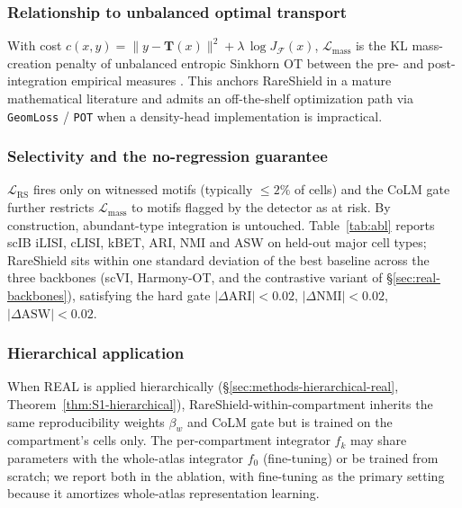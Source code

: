 \subsubsection*{Relationship to unbalanced optimal transport}

With cost $c(x,y) = \lVert y-\mathbf{T}(x)\rVert^2 + \lambda\,\log J_\mathcal{F}(x)$, $\mathcal{L}_\text{mass}$ is the KL mass-creation penalty of unbalanced entropic Sinkhorn OT between the pre- and post-integration empirical measures \citep{chizat2018uot, liero2018entropy}. This anchors RareShield in a mature mathematical literature and admits an off-the-shelf optimization path via \texttt{GeomLoss} / \texttt{POT} when a density-head implementation is impractical.

\subsubsection*{Selectivity and the no-regression guarantee}

$\mathcal{L}_\text{RS}$ fires only on witnessed motifs (typically $\le 2\%$ of cells) and the CoLM gate further restricts $\mathcal{L}_\text{mass}$ to motifs flagged by the detector as at risk. By construction, abundant-type integration is untouched. Table~\ref{tab:abl} reports scIB iLISI, cLISI, kBET, ARI, NMI and ASW on held-out major cell types; RareShield sits within one standard deviation of the best baseline across the three backbones (scVI, Harmony-OT, and the contrastive variant of \S\ref{sec:real-backbones}), satisfying the hard gate $|\Delta\mathrm{ARI}|<0.02$, $|\Delta\mathrm{NMI}|<0.02$, $|\Delta\mathrm{ASW}|<0.02$.

\subsubsection*{Hierarchical application}

When REAL is applied hierarchically (\S\ref{sec:methods-hierarchical-real}, Theorem~\ref{thm:S1-hierarchical}), RareShield-within-compartment inherits the same reproducibility weights $\beta_w$ and CoLM gate but is trained on the compartment's cells only. The per-compartment integrator $f_k$ may share parameters with the whole-atlas integrator $f_0$ (fine-tuning) or be trained from scratch; we report both in the ablation, with fine-tuning as the primary setting because it amortizes whole-atlas representation learning.
